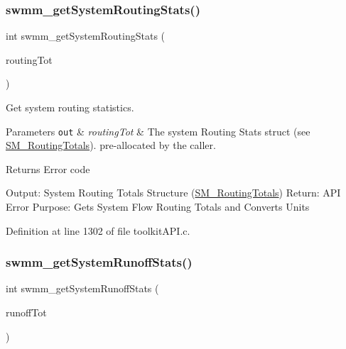 \subsubsection{\texorpdfstring{swmm\+\_\+get\+System\+Routing\+Stats()}{swmm\_getSystemRoutingStats()}}
{\footnotesize\ttfamily int swmm\+\_\+get\+System\+Routing\+Stats (\begin{DoxyParamCaption}\item[{\hyperlink{struct_s_m___routing_totals}{S\+M\+\_\+\+Routing\+Totals} $\ast$}]{routing\+Tot }\end{DoxyParamCaption})}



Get system routing statistics. 


\begin{DoxyParams}[1]{Parameters}
\mbox{\tt out}  & {\em routing\+Tot} & The system Routing Stats struct (see \hyperlink{struct_s_m___routing_totals}{S\+M\+\_\+\+Routing\+Totals}). pre-\/allocated by the caller. \\
\hline
\end{DoxyParams}
\begin{DoxyReturn}{Returns}
Error code
\end{DoxyReturn}
Output\+: System Routing Totals Structure (\hyperlink{struct_s_m___routing_totals}{S\+M\+\_\+\+Routing\+Totals}) Return\+: A\+PI Error Purpose\+: Gets System Flow Routing Totals and Converts Units 

Definition at line 1302 of file toolkit\+A\+P\+I.\+c.

\mbox{\label{group__tkfuncs_gabf3ea290e2af763289e18db435ea2ccd}} 
\subsubsection{\texorpdfstring{swmm\+\_\+get\+System\+Runoff\+Stats()}{swmm\_getSystemRunoffStats()}}
{\footnotesize\ttfamily int swmm\+\_\+get\+System\+Runoff\+Stats (\begin{DoxyParamCaption}\item[{\hyperlink{struct_s_m___runoff_totals}{S\+M\+\_\+\+Runoff\+Totals} $\ast$}]{runoff\+Tot }\end{DoxyParamCaption})}



